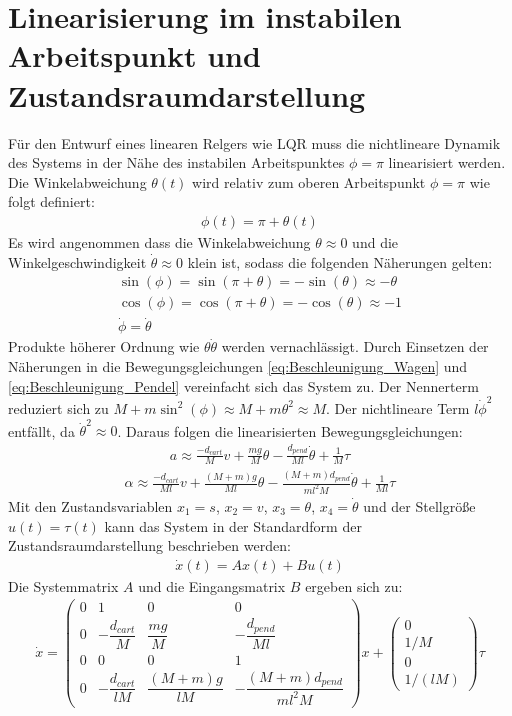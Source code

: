 \section{Linearisierung im instabilen Arbeitspunkt und Zustandsraumdarstellung}
Für den Entwurf eines linearen Relgers wie LQR muss die nichtlineare Dynamik des Systems in der Nähe des instabilen Arbeitspunktes $\phi = \pi$ linearisiert werden.
Die Winkelabweichung $\theta(t)$ wird relativ zum oberen Arbeitspunkt $\phi = \pi$ wie folgt definiert:
\begin{align}
    \phi(t) = \pi + \theta(t)
\end{align}
Es wird angenommen dass die Winkelabweichung $\theta \approx 0$ und die Winkelgeschwindigkeit $\dot{\theta} \approx 0$ klein ist, sodass die folgenden Näherungen gelten:
\begin{align}
    \sin(\phi) = \sin(\pi + \theta) = -\sin(\theta) \approx -\theta \\
    \cos(\phi) = \cos(\pi + \theta) = -\cos(\theta) \approx -1 \\
    \dot{\phi} = \dot{\theta}
\end{align}
Produkte höherer Ordnung wie $\theta \dot{\theta}$ werden vernachlässigt.
Durch Einsetzen der Näherungen in die Bewegungsgleichungen \eqref{eq:Beschleunigung_Wagen} und \eqref{eq:Beschleunigung_Pendel} vereinfacht sich das System zu.
Der Nennerterm reduziert sich zu $M+m\sin^2(\phi) \approx M + m \theta^2 \approx M$.
Der nichtlineare Term $l \dot{\phi}^2$ entfällt, da $\dot{\theta}^2 \approx 0$.
Daraus folgen die linearisierten Bewegungsgleichungen:
\begin{align}
    a \approx \frac{-d_{cart}}{M} v + \frac{m g}{M} \theta -\frac{d_{pend}}{M l} \dot{\theta} + \frac{1}{M} \tau
\end{align}
\begin{align}
    \alpha \approx \frac{-d_{cart}}{M l} v + \frac{(M+m) g}{M l} \theta -\frac{(M+m) d_{pend}}{m l^2 M} \dot{\theta} + \frac{1}{M l} \tau
\end{align}
Mit den Zustandsvariablen $x_1 = s$, $x_2 = v$, $x_3 = \theta$, $x_4 = \dot{\theta}$ und der Stellgröße $u(t) = \tau (t)$ kann das System in der Standardform der Zustandsraumdarstellung beschrieben werden:
\begin{align}
    \dot{x}(t) = A x(t) + B u(t)
\end{align}
Die Systemmatrix $A$ und die Eingangsmatrix $B$ ergeben sich zu:
\begin{align}
    \dot x = \begin{pmatrix}
0 & 1 & 0 & 0 \\
0 & -\dfrac{d_{cart}}{M} & \dfrac{mg}{M} & -\dfrac{d_{pend}}{Ml} \\
0 & 0 & 0 & 1 \\
0 & -\dfrac{d_{cart}}{lM} & \dfrac{(M+m)g}{lM} & -\dfrac{(M+m)d_{pend}}{ml^2M}
\end{pmatrix} x
+ \begin{pmatrix}0\\ 1/M\\ 0\\ 1/(lM)\end{pmatrix}\tau
\end{align}

